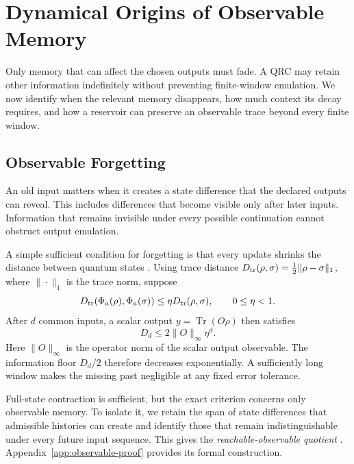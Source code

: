 \section{Dynamical Origins of Observable Memory}
\label{sec:dynamics}

Only memory that can affect the chosen outputs must fade. A QRC may retain
other information indefinitely without preventing finite-window emulation.
We now identify when the relevant memory disappears, how much context its
decay requires, and how a reservoir can preserve an observable trace beyond
every finite window.

\subsection{Observable Forgetting}

An old input matters when it creates a state difference that the declared
outputs can reveal. This includes differences that become visible only
after later inputs. Information that remains invisible under every possible
continuation cannot obstruct output emulation.

A simple sufficient condition for forgetting is that every update shrinks
the distance between quantum states \cite{chen2020temporal}. Using trace distance
$D_{\rm tr}(\rho,\sigma)=\tfrac12\|\rho-\sigma\|_1$, where $\|\cdot\|_1$
is the trace norm, suppose
\begin{equation}
 D_{\rm tr}\!\left(\Phi_a(\rho),\Phi_a(\sigma)\right)
 \leq\eta D_{\rm tr}(\rho,\sigma),\qquad 0\leq\eta<1.
 \label{eq:incremental-channel}
\end{equation}
After $d$ common inputs, a scalar output $y=\operatorname{Tr}(O\rho)$
then satisfies
\begin{equation}
 D_d\leq 2\|O\|_\infty\eta^d.
 \label{eq:contraction-bound}
\end{equation}
Here $\|O\|_\infty$ is the operator norm of the scalar output observable.
The information floor $D_d/2$ therefore decreases exponentially.
A sufficiently long window makes the missing past negligible at any fixed
error tolerance.

Full-state contraction is sufficient, but the exact criterion concerns only
observable memory. To isolate it, we retain the span of state differences
that admissible histories can create and identify those that remain
indistinguishable under every future input sequence. This gives the
\emph{reachable-observable quotient}
\cite{grigoryeva2021canonicalization}. Appendix~\ref{app:observable-proof}
provides its formal construction.

